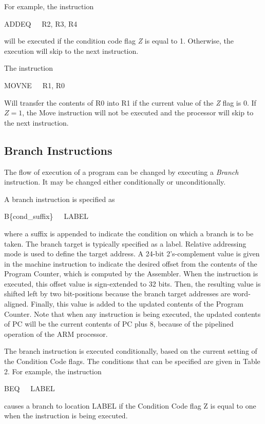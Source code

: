 \documentclass[11pt, twoside, pdftex]{article}
\begin{document}
For example, the instruction
\begin{center}
ADDEQ~~~R2, R3, R4
\end{center}
\noindent
will be executed if the condition code flag {\it Z} is equal to 1. 
Otherwise, the execution will skip to the next instruction.

The instruction
\begin{center}
MOVNE~~~R1, R0
\end{center}
\noindent
Will transfer the contents of R0 into R1 if the
current value of the {\it Z} flag is 0. If $Z =1$, the Move instruction will not be executed and
the processor will skip to the next instruction.

\subsection{Branch Instructions}
\label{sec:branch}

The flow of execution of a program can be changed by executing a {\it Branch} instruction.
It may be changed either conditionally or unconditionally.
 
A branch instruction is specified as 
\begin{center}
B\{cond\_suffix\}~~~LABEL
\end{center}
\noindent
where a suffix is appended to indicate the condition on which a
branch is to be taken. The branch target is typically specified
as a label. Relative addressing mode is used to define the target
address. A 24-bit 2's-complement value is given in the machine
instruction to indicate the desired offset from the
contents of the Program Counter, which is computed by the
Assembler. When the instruction is executed, this offset value is sign-extended to 32 bits.
Then, the resulting value is shifted left by two bit-positions
because the branch target addresses are word-aligned. Finally,
this value is added to the updated contents of the Program
Counter. Note that when any instruction is being executed, the
updated contents of PC will be the current contents of PC plus 8,
because of the pipelined operation of the ARM processor. 

The branch instruction is executed conditionally, based on the
current setting of the Condition Code flags. The conditions that
can be specified are given in Table 2. For example, the
instruction
\begin{center}
BEQ~~~LABEL
\end{center}
\noindent
causes a branch to location LABEL if the Condition Code flag Z
is equal to one when the instruction is being executed.
\end{document}
